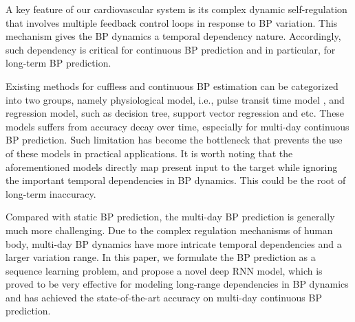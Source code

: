 \documentclass[letterpaper, 10 pt, conference]{ieeeconf}
\begin{document}
A key feature of our cardiovascular system is its complex dynamic self-regulation that involves multiple feedback control loops in response to BP variation\cite{guyton1972arterial}. 
This mechanism gives the BP dynamics a temporal dependency nature. Accordingly, such dependency is critical for continuous BP prediction and in particular, for long-term BP prediction.


Existing methods for cuffless and continuous BP estimation can be categorized into two groups, namely physiological model, i.e., pulse transit time model\cite{chen2000continuous} \cite{poon2006cuff}, and regression model, such as decision tree, support vector regression and etc\cite{miao2017novel}\cite{jain2016sparse}. 
These models suffers from accuracy decay over time, especially for multi-day continuous BP prediction. 
Such limitation has become the bottleneck that prevents the use of these models in practical applications. 
It is worth noting that the aforementioned models directly map present input to the target while ignoring the important temporal dependencies in BP dynamics. 
This could be the root of long-term inaccuracy. 
 

Compared with static BP prediction, the multi-day BP prediction is generally much more challenging. 
Due to the complex regulation mechanisms of human body, multi-day BP dynamics have more intricate temporal dependencies and a larger variation range.
In this paper, we formulate the BP prediction as a sequence learning problem, and propose a novel deep RNN model, which is proved to be very effective for modeling long-range dependencies in BP dynamics and
has achieved the state-of-the-art accuracy on multi-day continuous BP prediction.
\end{document}

